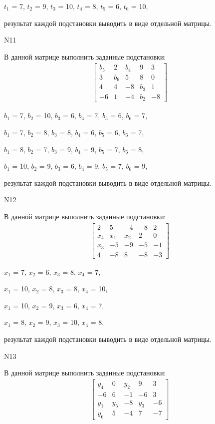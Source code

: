 \documentclass[11pt]{report}
\begin{document}
$t_{1}$ = 7, $t_{2}$ = 9, $t_{3}$ = 10, $t_{4}$ = 8, $t_{5}$ = 6, $t_{6}$ = 10, 

результат каждой подстановки выводить в виде отдельной матрицы.

N11

В данной матрице выполнить заданные подстановки:
\begin{align*}
\left[\begin{matrix}b_{5} & 2 & b_{4} & 9 & 3\\3 & b_{6} & 5 & 8 & 0\\4 & 4 & -8 & b_{3} & 1\\-6 & 1 & -4 & b_{2} & -8\end{matrix}\right]
\end{align*}


$b_{1}$ = 7, $b_{2}$ = 10, $b_{3}$ = 6, $b_{4}$ = 7, $b_{5}$ = 6, $b_{6}$ = 7, 

$b_{1}$ = 7, $b_{2}$ = 8, $b_{3}$ = 8, $b_{4}$ = 6, $b_{5}$ = 6, $b_{6}$ = 7, 

$b_{1}$ = 8, $b_{2}$ = 7, $b_{3}$ = 9, $b_{4}$ = 9, $b_{5}$ = 7, $b_{6}$ = 8, 

$b_{1}$ = 10, $b_{2}$ = 9, $b_{3}$ = 6, $b_{4}$ = 9, $b_{5}$ = 7, $b_{6}$ = 9, 

результат каждой подстановки выводить в виде отдельной матрицы.

N12

В данной матрице выполнить заданные подстановки:
\begin{align*}
\left[\begin{matrix}2 & 5 & -4 & -8 & 2\\x_{4} & x_{1} & x_{2} & 2 & 0\\x_{3} & -5 & -9 & -5 & -1\\4 & -8 & 8 & -8 & -3\end{matrix}\right]
\end{align*}


$x_{1}$ = 7, $x_{2}$ = 6, $x_{3}$ = 8, $x_{4}$ = 7, 

$x_{1}$ = 10, $x_{2}$ = 8, $x_{3}$ = 8, $x_{4}$ = 10, 

$x_{1}$ = 10, $x_{2}$ = 9, $x_{3}$ = 6, $x_{4}$ = 7, 

$x_{1}$ = 8, $x_{2}$ = 9, $x_{3}$ = 10, $x_{4}$ = 8, 

результат каждой подстановки выводить в виде отдельной матрицы.

N13

В данной матрице выполнить заданные подстановки:
\begin{align*}
\left[\begin{matrix}y_{4} & 0 & y_{2} & 9 & 3\\-6 & 6 & -1 & -6 & 3\\y_{1} & y_{5} & -8 & y_{3} & -6\\y_{6} & 5 & -4 & 7 & -7\end{matrix}\right]
\end{align*}
\end{document}
